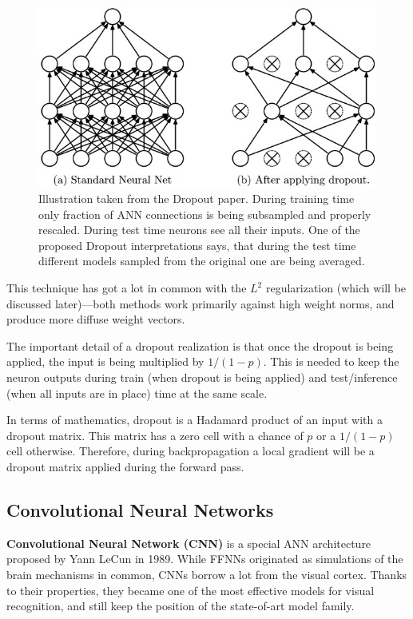 \documentclass[thesis=B,english]{FITthesis}[2019/12/23]
\begin{document}
	\begin{figure}[h]
		\includegraphics[width=\textwidth]{images/dropout.jpeg}
		\caption{Illustration taken from the Dropout paper\cite{dropout}. During training time only fraction of ANN connections is being subsampled and properly rescaled. During test time neurons see all their inputs. One of the proposed Dropout interpretations says, that during the test time different models sampled from the original one are being averaged.}
	\end{figure}
	
	This technique has got a lot in common with the $L^2$ regularization (which will be discussed later)---both methods work primarily against high weight norms, and produce more diffuse weight vectors.
	
	The important detail of a dropout realization is that once the dropout is being applied, the input is being multiplied by $1/(1-p)$. This is needed to keep the neuron outputs during train (when dropout is being applied) and test/inference (when all inputs are in place) time at the same scale.
	
	In terms of mathematics, dropout is a Hadamard product of an input with a dropout matrix. This matrix has a zero cell with a chance of $p$ or a $1/(1-p)$ cell otherwise. Therefore, during backpropagation a local gradient will be a dropout matrix applied during the forward pass.
	
	\subsection{Convolutional Neural Networks}
	
	\textbf{Convolutional Neural Network (CNN)} is a special ANN architecture proposed by Yann LeCun in 1989\cite{LeCunBoserDenkerEtAl89}. While FFNNs originated as simulations of the brain mechanisms in common, CNNs borrow a lot from the visual cortex\cite{hubel1962receptive}. Thanks to their properties, they became one of the most effective models for visual recognition, and still keep the position of the state-of-art model family.
	
\end{document}
